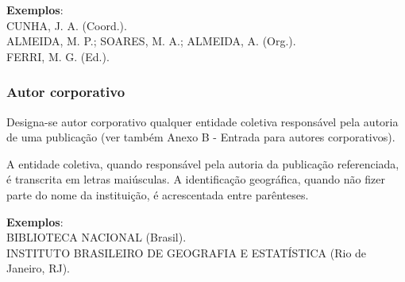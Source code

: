 \begin{exemplomanual}
\textbf{Exemplos}:\\
CUNHA, J. A. (Coord.).\\
ALMEIDA, M. P.; SOARES, M. A.; ALMEIDA, A. (Org.).\\
FERRI, M. G. (Ed.).
\end{exemplomanual}


\subsubsection{Autor corporativo}

Designa-se autor corporativo qualquer entidade coletiva responsável pela autoria de uma publicação (ver também Anexo B - Entrada para autores corporativos).

A entidade coletiva, quando responsável pela autoria da publicação referenciada, é transcrita em letras maiúsculas. A identificação geográfica, quando não fizer parte do nome da instituição, é acrescentada entre parênteses.

\begin{exemplomanual}
\textbf{Exemplos}:\\
BIBLIOTECA NACIONAL (Brasil).\\
INSTITUTO BRASILEIRO DE GEOGRAFIA E ESTATÍSTICA (Rio de Janeiro, RJ).
\end{exemplomanual}

